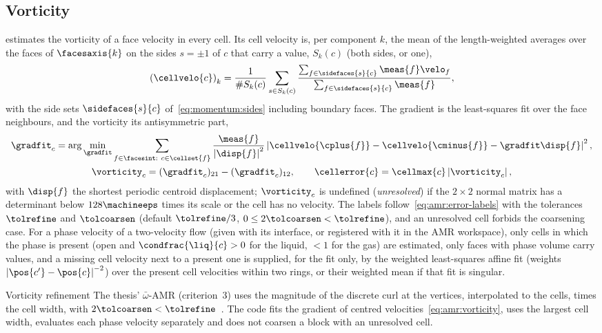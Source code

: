 \subsection{Vorticity}\label{sec:amr:vorticity}
 estimates the vorticity of a face
velocity in every cell. Its cell velocity is, per component $k$, the mean of
the length-weighted averages over the faces of $\facesaxis{k}$ on the sides
$s=\pm1$ of $c$ that carry a value, $S_k(c)$ (both sides, or one),
\begin{equation}\label{eq:amr:centred}
  \roundpar{\cellvelo{c}}_k=\frac{1}{\#S_k(c)}\sum_{s\in S_k(c)}
  \frac{\sum_{f\in\sidefaces{s}{c}}\meas{f}\velo_f}{\sum_{f\in\sidefaces{s}{c}}\meas{f}},
\end{equation}
with the side sets $\sidefaces{s}{c}$ of~\cref{eq:momentum:sides} including
boundary faces. The gradient is the least-squares fit over the face
neighbours, and the vorticity its antisymmetric part,
\begin{equation}\label{eq:amr:vorticity}
  \begin{gathered}
  \gradfit_c=\arg\min_{\gradfit}\sum_{f\in\facesint:\ c\in\cellset{f}}
    \frac{\meas{f}}{\abs{\disp{f}}^2}\abs{\cellvelo{\cplus{f}}-\cellvelo{\cminus{f}}-\gradfit\disp{f}}^2,\\
  \vorticity_c=(\gradfit_c)_{21}-(\gradfit_c)_{12},
  \qquad
  \cellerror{c}=\cellmax{c}\abs{\vorticity_c},
  \end{gathered}
\end{equation}
with $\disp{f}$ the shortest periodic centroid displacement; $\vorticity_c$ is
undefined (\emph{unresolved}) if the $2\times2$ normal matrix has a
determinant below $128\machineeps$ times its scale or the cell has no
velocity. The labels follow~\cref{eq:amr:error-labels} with the tolerances
$\tolrefine$ and $\tolcoarsen$ (default $\tolrefine/3$,
$0\le2\tolcoarsen<\tolrefine$), and an unresolved cell forbids the coarsening
case. For a phase velocity of a two-velocity flow (given with its interface,
or registered with it in the AMR workspace), only cells in which the phase is
present (open and $\condfrac{\liq}{c}>0$ for the liquid, $<1$ for the gas) are
estimated, only faces with phase volume carry values, and a missing cell
velocity next to a present one is supplied, for the fit only, by the weighted
least-squares affine fit (weights $\abs{\pos{c'}-\pos{c}}^{-2}$) over the
present cell velocities within two rings, or their weighted mean if that fit
is singular.

\begin{deviation}{Vorticity refinement}\label{dev:amr:vorticity}
The thesis' $\bar\omega$-AMR (criterion~3) uses the magnitude of the discrete
curl at the vertices, interpolated to the cells, times the cell width, with
$2\tolcoarsen<\tolrefine$~. The code fits the gradient of
centred velocities~\cref{eq:amr:vorticity}, uses the largest cell width,
evaluates each phase velocity separately and does not coarsen a block with an
unresolved cell.
\end{deviation}


